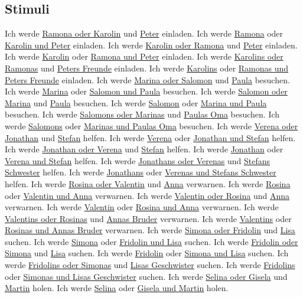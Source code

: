 \documentclass[output=paper]{langscibook}
\begin{document}
\begin{paperappendix}\largerpage
\section{Stimuli}\label{appendix:schuboe:a}
\ea
\ea Ich werde \uline{Ramona oder Karolin} und \uline{Peter} einladen.
\ex Ich werde \uline{Ramona} oder \uline{Karolin und Peter} einladen.
\ex Ich werde \uline{Karolin oder Ramona} und \uline{Peter} einladen.
\ex Ich werde \uline{Karolin} oder \uline{Ramona und Peter} einladen.
\ex Ich werde \uline{Karolins oder Ramonas} und \uline{Peters Freunde} einladen.
\ex Ich werde \uline{Karolins} oder \uline{Ramonas und Peters Freunde} einladen.
\z
\ex
\ea Ich werde \uline{Marina oder Salomon} und \uline{Paula} besuchen.		
\ex Ich werde \uline{Marina} oder \uline{Salomon und Paula} besuchen.			
\ex Ich werde \uline{Salomon oder Marina} und \uline{Paula} besuchen.		
\ex Ich werde \uline{Salomon} oder \uline{Marina und Paula} besuchen.			
\ex Ich werde \uline{Salomons oder Marinas} und \uline{Paulas Oma} besuchen.
\ex Ich werde \uline{Salomons} oder \uline{Marinas und Paulas Oma} besuchen.
\z
\ex
\ea Ich werde \uline{Verena oder Jonathan} und \uline{Stefan} helfen.
\ex Ich werde \uline{Verena} oder \uline{Jonathan und Stefan} helfen.
\ex Ich werde \uline{Jonathan oder Verena} und \uline{Stefan} helfen.
\ex Ich werde \uline{Jonathan} oder \uline{Verena und Stefan} helfen.
\ex Ich werde \uline{Jonathans oder Verenas} und \uline{Stefans Schwester} helfen.
\ex Ich werde \uline{Jonathans} oder \uline{Verenas und Stefans Schwester} helfen.
\z
\ex
\ea Ich werde \uline{Rosina oder Valentin} und \uline{Anna} verwarnen.
\ex Ich werde \uline{Rosina} oder \uline{Valentin und Anna} verwarnen.
\ex Ich werde \uline{Valentin oder Rosina} und \uline{Anna} verwarnen.
\ex Ich werde \uline{Valentin} oder \uline{Rosina und Anna} verwarnen.
\ex Ich werde \uline{Valentins oder Rosinas} und \uline{Annas Bruder} verwarnen.
\ex Ich werde \uline{Valentins} oder \uline{Rosinas und Annas Bruder} verwarnen.
\z
\ex
\ea Ich werde \uline{Simona oder Fridolin} und \uline{Lisa} suchen.
\ex Ich werde \uline{Simona} oder \uline{Fridolin und Lisa} suchen.
\ex Ich werde \uline{Fridolin oder Simona} und \uline{Lisa} suchen.
\ex Ich werde \uline{Fridolin} oder \uline{Simona und Lisa} suchen.
\ex Ich werde \uline{Fridolins oder Simonas} und \uline{Lisas Geschwister} suchen.
\ex Ich werde \uline{Fridolins} oder \uline{Simonas und Lisas Geschwister} suchen.
\z
\ex
\ea Ich werde \uline{Selina oder Gisela} und \uline{Martin} holen.
\ex Ich werde \uline{Selina} oder \uline{Gisela und Martin} holen.

\end{paperappendix}
\end{document}
